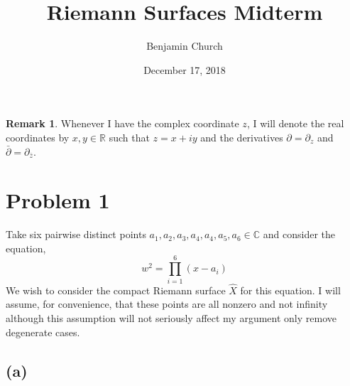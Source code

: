 \documentclass[12pt]{extarticle}
\title{Riemann Surfaces Midterm}
\author{Benjamin Church}
\date{December 17, 2018}
\newcommand{\R}{\mathbb{R}}
\newcommand{\C}{\mathbb{C}}
\theoremstyle{definition}
\newtheorem{remark}{Remark}
\begin{document}
\maketitle

\begin{remark}
Whenever I have the complex coordinate $z$, I will  denote the real coordinates by $x, y \in \R$ such that $z = x + iy$ and the derivatives $\partial = \partial_z$ and $\bar{\partial} = \partial_{\bar{z}}$.
\end{remark}

\section*{Problem 1}

Take six pairwise distinct points $a_1, a_2, a_3, a_4, a_4, a_5, a_6 \in \C$ and consider the equation,
\[ w^2 = \prod_{i = 1}^6 (x - a_i) \]
We wish to consider the compact Riemann surface $\hat{X}$ for this equation. I will assume, for convenience, that these points are all nonzero and not infinity although this assumption will not seriously affect my argument only remove degenerate cases.

\subsection*{(a)}
\end{document}
